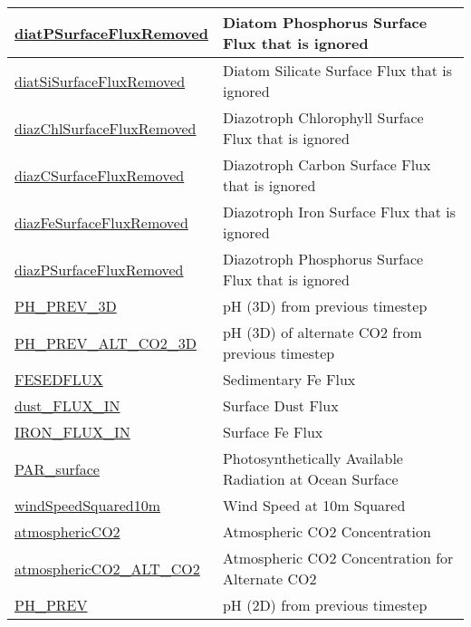 {\begin{center}
\begin{longtable}{| p{2.0in} | p{4.0in} |}
    \hline
    \hyperref[subsec:var_sec_forcing_diatPSurfaceFluxRemoved]{diatPSurfaceFluxRemoved} & Diatom Phosphorus Surface Flux that is ignored \\
    \hline
    \hyperref[subsec:var_sec_forcing_diatSiSurfaceFluxRemoved]{diatSiSurfaceFluxRemoved} & Diatom Silicate Surface Flux that is ignored \\
    \hline
    \hyperref[subsec:var_sec_forcing_diazChlSurfaceFluxRemoved]{diazChlSurfaceFluxRemoved} & Diazotroph Chlorophyll Surface Flux that is ignored \\
    \hline
    \hyperref[subsec:var_sec_forcing_diazCSurfaceFluxRemoved]{diazCSurfaceFluxRemoved} & Diazotroph Carbon Surface Flux that is ignored \\
    \hline
    \hyperref[subsec:var_sec_forcing_diazFeSurfaceFluxRemoved]{diazFeSurfaceFluxRemoved} & Diazotroph Iron Surface Flux that is ignored \\
    \hline
    \hyperref[subsec:var_sec_forcing_diazPSurfaceFluxRemoved]{diazPSurfaceFluxRemoved} & Diazotroph Phosphorus Surface Flux that is ignored \\
    \hline
    \hyperref[subsec:var_sec_forcing_PH_PREV_3D]{PH\_PREV\_3D} & pH (3D) from previous timestep \\
    \hline
    \hyperref[subsec:var_sec_forcing_PH_PREV_ALT_CO2_3D]{PH\_PREV\_ALT\_CO2\_3D} & pH (3D) of alternate CO2 from previous timestep \\
    \hline
    \hyperref[subsec:var_sec_forcing_FESEDFLUX]{FESEDFLUX} & Sedimentary Fe Flux \\
    \hline
    \hyperref[subsec:var_sec_forcing_dust_FLUX_IN]{dust\_FLUX\_IN} & Surface Dust Flux \\
    \hline
    \hyperref[subsec:var_sec_forcing_IRON_FLUX_IN]{IRON\_FLUX\_IN} & Surface Fe Flux \\
    \hline
    \hyperref[subsec:var_sec_forcing_PAR_surface]{PAR\_surface} & Photosynthetically Available Radiation at Ocean Surface \\
    \hline
    \hyperref[subsec:var_sec_forcing_windSpeedSquared10m]{windSpeedSquared10m} & Wind Speed at 10m Squared \\
    \hline
    \hyperref[subsec:var_sec_forcing_atmosphericCO2]{atmosphericCO2} & Atmospheric CO2 Concentration \\
    \hline
    \hyperref[subsec:var_sec_forcing_atmosphericCO2_ALT_CO2]{atmosphericCO2\_ALT\_CO2} & Atmospheric CO2 Concentration for Alternate CO2 \\
    \hline
    \hyperref[subsec:var_sec_forcing_PH_PREV]{PH\_PREV} & pH (2D) from previous timestep \\

\end{longtable}
\end{center}}
